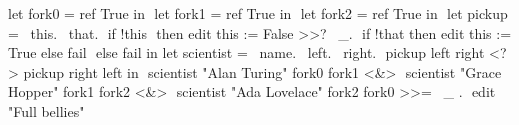 \noindent
\begin{minipage}[r]{0.55\textwidth}

\begin{TASK}[
    numbers=right,
    caption={Dining philosophers problem with three computer scientists.},
    captionpos=b,
    label=lst:dining]
  let fork0 = ref True in $\label{lst:phil:fork0}$
  let fork1 = ref True in $\label{lst:phil:fork1}$
  let fork2 = ref True in $\label{lst:phil:fork2}$
  let pickup = \ this. \ that. $\label{lst:phil:this}$
    if !this $\label{lst:phil:deref}$
      then edit this := False >>? \ _. $\label{lst:phil:mark-used}$
        if !that then edit this := True else fail $\label{lst:phil:that}$
      else fail in
  let scientist = \ name. \ left. \ right. $\label{lst:phil:scientist}$
    pickup left right <?> pickup right left in $\label{lst:phil:pick}$
  scientist "Alan Turing" fork0 fork1 <&> $\label{lst:phil:scientist0}$
  scientist "Grace Hopper" fork1 fork2 <&> $\label{lst:phil:scientist1}$
  scientist "Ada Lovelace" fork2 fork0 >>= \ _ . $\label{lst:phil:scientist2}$
    edit "Full bellies"
\end{TASK}
\end{minipage}
\begin{minipage}[r]{0.05\textwidth}
  \
\end{minipage}
